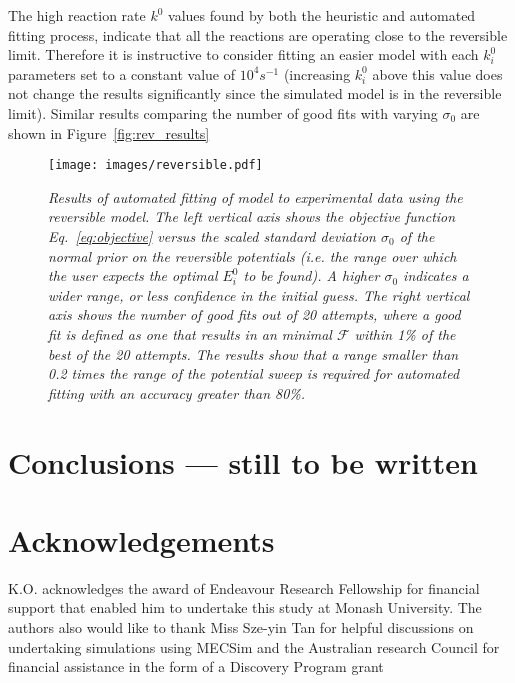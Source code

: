 \documentclass[a4paper, 12pt]{article}
\begin{document}
The high reaction rate $k^0$ values found by both the heuristic and automated
fitting process, indicate that all the reactions are operating close to the
reversible limit. Therefore it is instructive to consider fitting an easier
model with each $k^0_i$ parameters set to a constant value of $10^4 s^{-1}$
(increasing $k^0_i$ above this value does not change the results significantly
since the simulated model is in the reversible limit). Similar results comparing the number of good fits with varying $\sigma_0$ are shown in Figure~\ref{fig:rev_results}

\begin{figure}[h]
\texttt{[image: images/reversible.pdf]}
    \caption{\it{Results of automated fitting of model to experimental data
    using the reversible model. The left vertical axis shows the objective
    function Eq.~\ref{eq:objective} versus the scaled standard deviation
    $\sigma_0$ of the normal prior on the reversible potentials (i.e. the range
    over which the user expects the optimal $E^0_i$ to be found). A higher
    $\sigma_0$ indicates a wider range, or less confidence in the initial guess.
    The right vertical axis shows the number of good fits out of 20 attempts,
    where a good fit is defined as one that results in an minimal $\mathcal{F}$
    within 1\% of the best of the 20 attempts. The results show that a range
    smaller than 0.2 times the range of the potential sweep is required for
    automated fitting with an accuracy greater than 80\%.}}
    \label{fig:quasi_results}
\end{figure}








\section{Conclusions --- still to be written}

\section{Acknowledgements}

K.O. acknowledges the award of Endeavour Research Fellowship for financial
support that enabled him to undertake this study at Monash University. The
authors also would like to thank Miss Sze-yin Tan for helpful discussions on
undertaking simulations using MECSim and the Australian research Council for
financial assistance in the form of a Discovery Program grant



\end{document}
